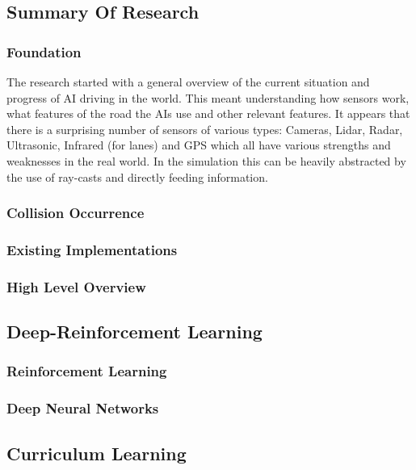 \documentclass{article}
\begin{document}
\subsection{Summary Of Research}
\subsubsection{Foundation}
The research started with a general overview of the current situation and progress of AI driving in the world. This meant understanding how sensors work, what features of the road the AIs use and other relevant features. It appears that there is a surprising number of sensors of various types: Cameras, Lidar, Radar, Ultrasonic, Infrared (for lanes) and GPS \cite{General-overview-of-ai-driving} which all have various strengths and weaknesses in the real world. In the simulation this can be heavily abstracted by the use of ray-casts and directly feeding information.

\subsubsection{Collision Occurrence}
\lipsum[2][1]

\subsubsection{Existing Implementations}
\lipsum[2][1]

\subsubsection{High Level Overview}
\lipsum[2][1]

\subsection{Deep-Reinforcement Learning}
\lipsum[2][1]

\subsubsection{Reinforcement Learning}
\lipsum[2][1]

\subsubsection{Deep Neural Networks}
\lipsum[2][1]

\subsection{Curriculum Learning}
\lipsum[2][1]
\end{document}
